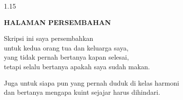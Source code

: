 \newpage
{}
{}
\begin{spacing}{1.15}
\begin{center}
    \textbf{HALAMAN PERSEMBAHAN}
\end{center}
\vspace*{\fill}
\begin{center}
\begin{minipage}{0.8\textwidth}
\centering
Skripsi ini saya persembahkan\\
untuk kedua orang tua dan keluarga saya,\\
yang tidak pernah bertanya kapan selesai,\\
tetapi selalu bertanya apakah saya sudah makan.\par
\vspace{1.0cm}
Juga untuk siapa pun yang pernah duduk di kelas harmoni\\
dan bertanya mengapa kuint sejajar harus dihindari.
\end{minipage}
\end{center}
\vspace*{\fill}
\end{spacing}

